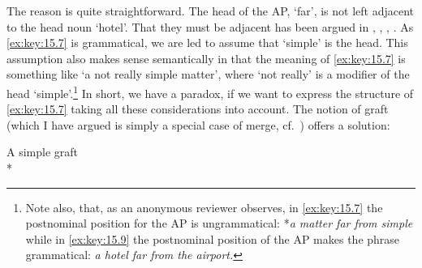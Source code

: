 \documentclass[output=paper]{langsci/langscibook}
\begin{document}
\begin{refcontext}
\label{ex:key:15.9}
\z
The reason is quite straightforward. The head of the AP, ‘far’, is not left
adjacent to the head noun ‘hotel’. That they must be adjacent has been argued
in \citet{Emonds1985,Emonds1976}, \citet{Williams1982},
\citet{VanRiemsdijk1993}, \citet{BibHolRob2014}. As \eqref{ex:key:15.7} is grammatical, we are
led to assume that ‘simple’ is the head. This assumption also makes sense
semantically in that the meaning of \eqref{ex:key:15.7} is something like ‘a not really simple
matter’, where ‘not really’ is a modifier of the head ‘simple’.\footnote{Note
    also, that, as an anonymous reviewer observes, in \eqref{ex:key:15.7} the postnominal
    position for the AP is ungrammatical: *\emph{a matter far from simple}
    while in \eqref{ex:key:15.9} the postnominal position of the AP makes the phrase
grammatical: \emph{a hotel far from the airport.} } In short, we have a
paradox, if we want to express the structure of \eqref{ex:key:15.7} taking all these
considerations  into account. The notion of graft (which I have argued is
simply a special case of merge, cf.~\cite{VanRiemsdijk2006b}) offers a solution:

\ea\label{ex:key:15.10} A simple graft\\*
\z


\end{refcontext}
\end{document}
